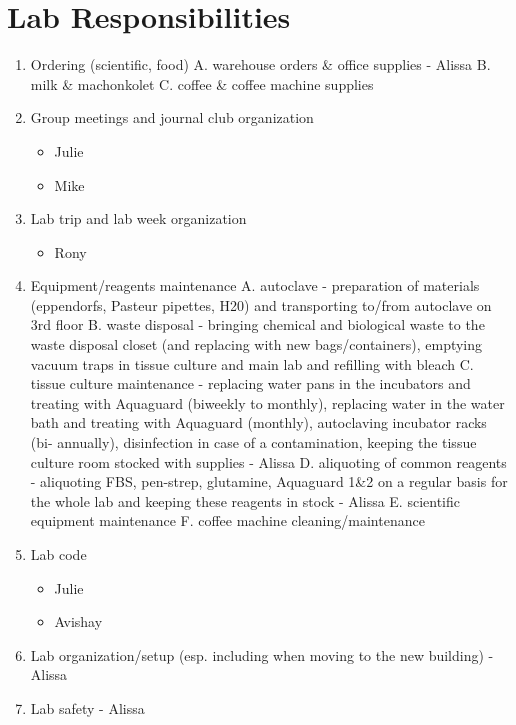 \documentclass[]{book}
\providecommand{\tightlist}{%
  \setlength{\itemsep}{0pt}\setlength{\parskip}{0pt}}
\begin{document}
\chapter{Lab Responsibilities}\label{labResponsibilities}

\begin{enumerate}
\def\labelenumi{\arabic{enumi}.}
\item
  Ordering (scientific, food) A. warehouse orders \& office supplies -
  Alissa B. milk \& machonkolet C. coffee \& coffee machine supplies
\item
  Group meetings and journal club organization

  \begin{itemize}
  \tightlist
  \item
    Julie
  \item
    Mike
  \end{itemize}
\item
  Lab trip and lab week organization

  \begin{itemize}
  \tightlist
  \item
    Rony
  \end{itemize}
\item
  Equipment/reagents maintenance A. autoclave - preparation of materials
  (eppendorfs, Pasteur pipettes, H20) and transporting to/from autoclave
  on 3rd floor B. waste disposal - bringing chemical and biological
  waste to the waste disposal closet (and replacing with new
  bags/containers), emptying vacuum traps in tissue culture and main lab
  and refilling with bleach C. tissue culture maintenance - replacing
  water pans in the incubators and treating with Aquaguard (biweekly to
  monthly), replacing water in the water bath and treating with
  Aquaguard (monthly), autoclaving incubator racks (bi- annually),
  disinfection in case of a contamination, keeping the tissue culture
  room stocked with supplies - Alissa D. aliquoting of common reagents -
  aliquoting FBS, pen-strep, glutamine, Aquaguard 1\&2 on a regular
  basis for the whole lab and keeping these reagents in stock - Alissa
  E. scientific equipment maintenance F. coffee machine
  cleaning/maintenance
\item
  Lab code

  \begin{itemize}
  \tightlist
  \item
    Julie
  \item
    Avishay
  \end{itemize}
\item
  Lab organization/setup (esp. including when moving to the new
  building) - Alissa
\item
  Lab safety - Alissa
\end{enumerate}
\end{document}
